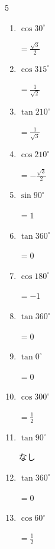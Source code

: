 \begin{multicols}{5}
\begin{enumerate}
  \item $\displaystyle \cos{30^\circ}$

        $\displaystyle =\frac{\sqrt{3}}{2}$

  \item $\displaystyle \cos{315^\circ}$

        $\displaystyle =\frac{1}{\sqrt{2}}$

  \item $\displaystyle \tan{210^\circ}$

        $\displaystyle =\frac{1}{\sqrt{3}}$

\columnbreak %

  \item $\displaystyle \cos{210^\circ}$

        $\displaystyle =-\frac{\sqrt{3}}{2}$

  \item $\displaystyle \sin{90^\circ}$

        $\displaystyle =1$

  \item $\displaystyle \tan{360^\circ}$

        $\displaystyle =0$

  \item $\displaystyle \cos{180^\circ}$

        $\displaystyle =-1$

  \item $\displaystyle \tan{360^\circ}$

        $\displaystyle =0$

  \item $\displaystyle \tan{0^\circ}$

        $\displaystyle =0$

  \item $\displaystyle \cos{300^\circ}$

        $\displaystyle =\frac{1}{2}$

  \item $\displaystyle \tan{90^\circ}$

        $\displaystyle なし$

  \item $\displaystyle \tan{360^\circ}$

        $\displaystyle =0$

  \item $\displaystyle \cos{60^\circ}$

        $\displaystyle =\frac{1}{2}$


\end{enumerate}
\end{multicols}
